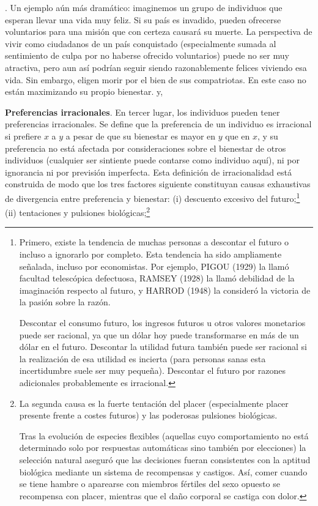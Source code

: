 \documentclass[10pt,a4paper]{article}
\newcounter{numitem}
\newenvironment{lnum}
      {\begin{list}{\arabic{numitem}.}{%
          \usecounter{numitem}%
          \setlength{\leftmargin}{1cm}%
          \setlength{\parskip}{3pt}%
          \setlength{\itemsep}{0pt}%
          \setlength{\parsep}{0pt}%
      }}
      {\end{list}}
\begin{document}
\begin{lnum}
{    Un ejemplo aún más dramático: imaginemos un grupo de individuos que esperan llevar una vida muy feliz. Si su país es invadido, pueden ofrecerse voluntarios para una misión que con certeza causará su muerte. La perspectiva de vivir como ciudadanos de un país conquistado (especialmente sumada al sentimiento de culpa por no haberse ofrecido voluntarios) puede no ser muy atractiva, pero aun así podrían seguir siendo razonablemente felices viviendo esa vida. Sin embargo, eligen morir por el bien de sus compatriotas. En este caso no están maximizando su propio bienestar.
    } y,
    \item \textbf{Preferencias irracionales}. En tercer lugar, los individuos pueden tener preferencias irracionales. Se define que la preferencia de un individuo es irracional si prefiere $x$ a $y$ a pesar de que su bienestar es mayor en $y$ que en $x$, y su preferencia no está afectada por consideraciones sobre el bienestar de otros individuos (cualquier ser sintiente puede contarse como individuo aquí), ni por ignorancia ni por previsión imperfecta. Esta definición de irracionalidad está construida de modo que los tres factores siguiente constituyan causas exhaustivas de divergencia entre preferencia y bienestar: (i) descuento excesivo del futuro;\footnote{%
        Primero, existe la tendencia de muchas personas a descontar el futuro o incluso a ignorarlo por completo. Esta tendencia ha sido ampliamente señalada, incluso por economistas. Por ejemplo, PIGOU (1929) la llamó facultad telescópica defectuosa, RAMSEY (1928) la llamó debilidad de la imaginación respecto al futuro, y HARROD (1948) la consideró la victoria de la pasión sobre la razón.
    
    Descontar el consumo futuro, los ingresos futuros u otros valores monetarios puede ser racional, ya que un dólar hoy puede transformarse en más de un dólar en el futuro. Descontar la utilidad futura también puede ser racional si la realización de esa utilidad es incierta (para personas sanas esta incertidumbre suele ser muy pequeña). Descontar el futuro por razones adicionales probablemente es irracional.
    } (ii) tentaciones y pulsiones biológicas;\footnote{%
        La segunda causa es la fuerte tentación del placer (especialmente placer presente frente a costes futuros) y las poderosas pulsiones biológicas.
    
    Tras la evolución de especies flexibles (aquellas cuyo comportamiento no está determinado solo por respuestas automáticas sino también por elecciones) la selección natural aseguró que las decisiones fueran consistentes con la aptitud biológica mediante un sistema de recompensas y castigos. Así, comer cuando se tiene hambre o aparearse con miembros fértiles del sexo opuesto se recompensa con placer, mientras que el daño corporal se castiga con dolor.
    
}
\end{lnum}
\end{document}
